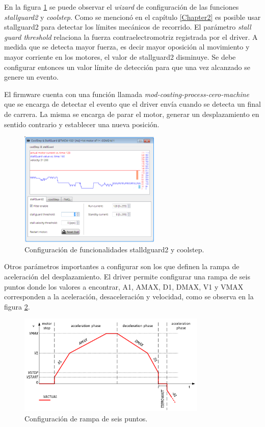 En la figura \ref{fig:tmcl_ide_stall} se puede observar el \textit{wizard} de configuración de las funciones \textit{stallguard2} y \textit{coolstep}.
Como se mencionó en el capítulo \ref{Chapter2} es posible usar stallguard2 para detectar los límites mecánicos de recorrido. El parámetro \textit{stall guard threshold} relaciona la fuerza contraelectromotriz registrada por el driver. A medida que se detecta mayor fuerza, es decir mayor oposición al movimiento y mayor corriente en los motores, el valor de stallguard2 disminuye. Se debe configurar entonces un valor límite de detección para que una vez alcanzado se genere un evento.

El firmware cuenta con una función llamada \textit{mod-coating-process-cero-machine} que se encarga de detectar el evento que el driver envía cuando se detecta un final de carrera. La misma se encarga de parar el motor, generar un desplazamiento en sentido contrario y establecer una nueva posición.

  

\begin{figure}[h!]
	\centering
	\includegraphics[width=0.6\textwidth]{./Figures/tmcl_ide_2.png}
	\caption{Configuración de funcionalidades stalldguard2 y coolstep.}
	\label{fig:tmcl_ide_stall}
\end{figure}

Otros parámetros importantes a configurar son los que definen la rampa de aceleración del desplazamiento. El driver permite configurar una rampa de seis puntos donde los valores a encontrar, A1, AMAX, D1, DMAX, V1 y VMAX corresponden a la aceleración, desaceleración y velocidad, como se observa en la figura \ref{fig:rampa}.



\begin{figure}[h!]
	\centering
	\includegraphics[width=0.8\textwidth]{./Figures/rampa_1.png}
	\caption{Configuración de rampa de seis puntos.}
	\label{fig:rampa}
\end{figure}


